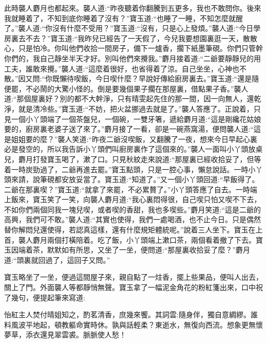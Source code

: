 \begin{parag}
    此時襲人麝月也都起來。襲人道:“昨夜聽着你翻騰到五更多，我也不敢問你。後來我就睡着了，不知到底你睡着了沒有？”寶玉道:“也睡了一睡，不知怎麼就醒了。”襲人道:“你沒有什麼不受用？”寶玉道:“沒有，只是心上發煩。”襲人道:“今日學房裏去不去？”寶玉道:“我昨兒已經告了一天假了，今兒我要想園裏逛一天，散散心，只是怕冷。你叫他們收拾一間房子，備下一爐香，擱下紙墨筆硯。你們只管幹你們的，我自己靜坐半天才好。別叫他們來攪我。”麝月接着道:“二爺要靜靜兒的用工夫，誰敢來攪。”襲人道:“這麼着很好，也省得着了涼。自己坐坐，心神也不散。”因又問:“你既懶待喫飯，今日喫什麼？早說好傳給廚房裏去。”寶玉道:“還是隨便罷，不必鬧的大驚小怪的。倒是要幾個果子擱在那屋裏，借點果子香。”襲人道:“那個屋裏好？別的都不大幹淨，只有晴雯起先住的那一間，因一向無人，還乾淨，就是清冷些。”寶玉道:“不妨，把火盆挪過去就是了。”襲人答應了。正說着，只見一個小丫頭端了一個茶盤兒，一個碗，一雙牙箸，遞給麝月道:“這是剛纔花姑娘要的，廚房裏老婆子送了來了。”麝月接了一看，卻是一碗燕窩湯，便問襲人道:“這是姐姐要的麼？”襲人笑道:“昨夜二爺沒喫飯，又翻騰了一夜，想來今日早起心裏必是發空的，所以我告訴小丫頭們叫廚房裏作了這個來的。”襲人一面叫小丫頭放桌兒，麝月打發寶玉喝了，漱了口。只見秋紋走來說道:“那屋裏已經收拾妥了，但等着一時炭勁過了，二爺再進去罷。”寶玉點頭，只是一腔心事，懶怠說話。一時小丫頭來請，說筆硯都安放妥當了。寶玉道:“知道了。”又一個小丫頭回道:“早飯得了。二爺在那裏喫？”寶玉道:“就拿了來罷，不必累贅了。”小丫頭答應了自去。一時端上飯來，寶玉笑了一笑，向襲人麝月道:“我心裏悶得很，自己喫只怕又喫不下去，不如你們兩個同我一塊兒喫，或者喫的香甜，我也多喫些。”麝月笑道:“這是二爺的高興，我們可不敢。”襲人道:“其實也使得，我們一處喝酒，也不止今日。只是偶然替你解悶兒還使得，若認真這樣，還有什麼規矩體統呢。”說着三人坐下。寶玉在上首，襲人麝月兩個打橫陪着。吃了飯，小丫頭端上漱口茶，兩個看着撤了下去。寶玉因端着茶，默默如有所思，又坐了一坐，便問道:“那屋裏收拾妥了麼？”麝月道:“頭裏就回過了，這回子又問。”
\end{parag}


\begin{parag}
    寶玉略坐了一坐，便過這間屋子來，親自點了一炷香，擺上些果品，便叫人出去，關上了門。外面襲人等都靜悄無聲。寶玉拿了一幅泥金角花的粉紅箋出來，口中祝了幾句，便提起筆來寫道:
\end{parag}


\begin{qute2sp}
    怡紅主人焚付晴姐知之，酌茗清香，庶幾來饗。其詞雲:隨身伴，獨自意綢繆。誰料風波平地起，頓教軀命實時休。孰與話輕柔？東逝水，無復向西流。想象更無懷夢草，添衣還見翠雲裘。脈脈使人愁！
\end{qute2sp}


